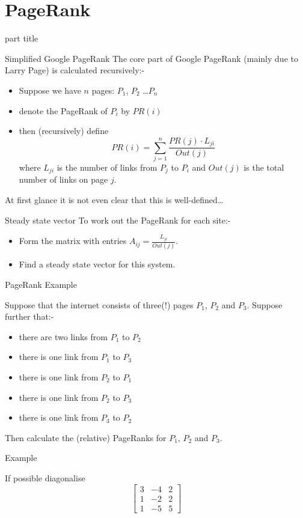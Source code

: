 \documentclass{beamer}
\begin{document}
\section{PageRank}

\begin{frame}
\begin{beamercolorbox}[sep=12pt,center]{part title}
\insertsection\par
\end{beamercolorbox}
\end{frame}

\begin{frame}{Simplified Google PageRank}
The core part of Google PageRank (mainly due to Larry Page) is calculated recursively:-\vfill
\begin{itemize}
	\item Suppose we have $n$ pages: $P_1$, $P_2$ \dots $P_n$\vfill
	\item denote the PageRank of $P_i$ by $PR(i)$\vfill
	\item then (recursively) define
	\begin{equation*}
	PR(i) = \sum_{j=1}^n \frac{PR(j)\cdot L_{ji}}{Out(j)}
	\end{equation*}
	where $L_{ji}$ is the number of links from $P_j$ to $P_i$ and $Out(j)$ is the total number of links on page $j$.
\end{itemize}\vfill
At first glance it is not even clear that this is well-defined\dots
\end{frame}

\begin{frame}{Steady state vector}
To work out the PageRank for each site:-
\begin{itemize}
	\item Form the matrix with entries $A_{ij} = \frac{L_{ji}}{Out(j)}$.
	\item Find a steady state vector for this system.
\end{itemize}
\end{frame}

\begin{frame}{PageRank Example}
\begin{example}
	Suppose that the internet consists of three(!) pages $P_1$, $P_2$ and $P_3$.
	Suppose further that:-
	\begin{itemize}
		\item there are two links from $P_1$ to $P_2$
		\item there is one link from $P_1$ to $P_3$
		\item there is one link from $P_2$ to $P_1$
		\item there is one link from $P_2$ to $P_3$
		\item there is one link from $P_3$ to $P_2$
	\end{itemize}
	Then calculate the (relative) PageRanks for $P_1$, $P_2$ and $P_3$.
\end{example}
\end{frame}

\begin{frame}{Example}
\begin{example}
If possible diagonalise
\[
\left[
\begin{matrix}
3&-4&2\\
1&-2&2\\
1&-5&5
\end{matrix}
\right]\]
\end{example}

\end{frame}
\end{document}
